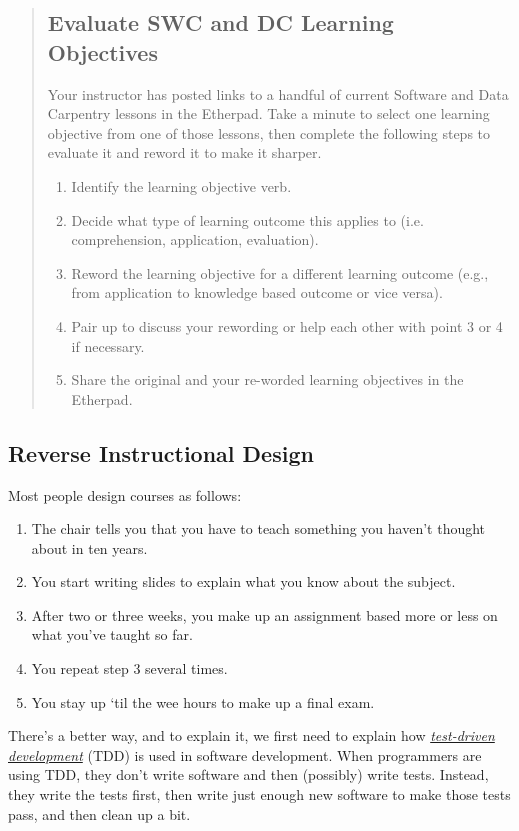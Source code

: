\begin{quotation}   %
\subsection*{Evaluate SWC and DC Learning Objectives}

Your instructor has posted links to a handful of current Software and Data Carpentry lessons in the Etherpad.
Take a minute to select one learning objective from one of those lessons,
then complete the following steps to evaluate it and reword it to make it sharper.

\begin{enumerate}
\item Identify the learning objective verb.
\item Decide what type of learning outcome this applies to (i.e. comprehension, application, evaluation).
\item Reword the learning objective for a different learning outcome (e.g., from application to knowledge based outcome or vice versa).
\item Pair up to discuss your rewording or help each other with point 3 or 4 if necessary.
\item Share the original and your re-worded learning objectives in the Etherpad.
\end{enumerate}
\end{quotation}   %

\subsection*{Reverse Instructional Design}

Most people design courses as follows:

\begin{enumerate}
\item The chair tells you that you have to teach something you haven't thought about in ten years.
\item You start writing slides to explain what you know about the subject.
\item After two or three weeks, you make up an assignment based more or less on what you've taught so far.
\item You repeat step 3 several times.
\item You stay up `til the wee hours to make up a final exam.
\end{enumerate}

There's a better way,
and to explain it,
we first need to explain how
\emph{\href{https://en.wikipedia.org/wiki/Test-driven\_development}{test-driven development}} (TDD)
is used in software development.
When programmers are using TDD,
they don't write software and then (possibly) write tests.
Instead,
they write the tests first,
then write just enough new software to make those tests pass,
and then clean up a bit.

